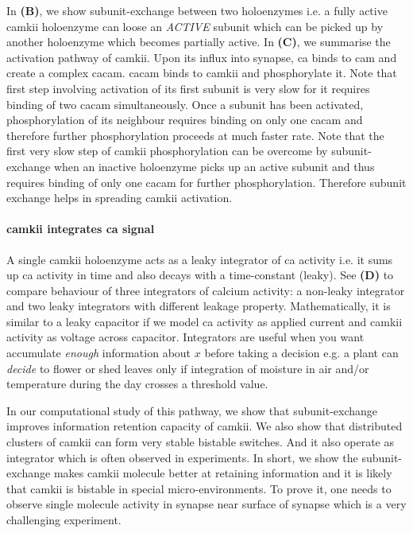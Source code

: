 \documentclass[]{resonance}
\begin{document}
{\begin{tikzpicture}[baseline, scale=1 , every node/.style={} ]
\end{tikzpicture}	

In \textbf{(B)}, we show subunit-exchange between two holoenzymes i.e. a fully
active \gls{camkii} holoenzyme can loose an \textit{ACTIVE} subunit which can be
picked up by another holoenzyme which becomes partially active. In
\textbf{(C)}, we summarise the activation pathway of \gls{camkii}. Upon its
influx into synapse, \gls{ca} binds to \gls{cam} and create a complex
\gls{cacam}. \gls{cacam} binds to \gls{camkii} and phosphorylate it. Note that
first step involving activation of its first subunit is very slow for it
requires binding of two \gls{cacam} simultaneously. Once a subunit has been
activated, phosphorylation of its neighbour requires binding on only one
\gls{cacam} and therefore further phosphorylation proceeds at much faster rate.
Note that the first very slow step of \gls{camkii} phosphorylation can be
overcome by subunit-exchange when an inactive holoenzyme picks up an active
subunit and thus requires binding of only one \gls{cacam} for further
phosphorylation. Therefore subunit exchange helps in spreading \gls{camkii}
activation. 

\paragraph{\gls{camkii} integrates \gls{ca} signal} A single \gls{camkii}
holoenzyme acts as a leaky integrator of \gls{ca} activity i.e. it sums up
\gls{ca} activity in time and also decays with a time-constant (leaky). See
\textbf{(D)} to compare behaviour of three integrators of calcium activity: a
non-leaky integrator and two leaky integrators with different leakage property.
Mathematically, it is similar to a leaky capacitor if we model \gls{ca} activity
as applied current and \gls{camkii} activity as voltage across capacitor.
Integrators are useful when you want accumulate \emph{enough} information about
$x$ before taking a decision e.g. a plant can \emph{decide} to flower or shed
leaves only if integration of moisture in air and/or temperature during the day
crosses a threshold value.
} %

In our computational study of this pathway, we show that subunit-exchange
improves information retention capacity of \gls{camkii}. We also show that
distributed clusters of \gls{camkii} can form very stable bistable switches. And
it also operate as integrator which is often observed in experiments. In short,
we show the subunit-exchange makes \gls{camkii} molecule better at retaining
information and it is likely that \gls{camkii} is bistable in special
micro-environments. To prove it, one needs to observe single molecule activity
in synapse near surface of synapse which is a very challenging experiment.
\end{document}
